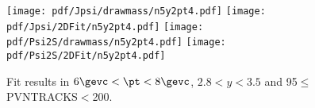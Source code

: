\begin{figure}[H]
\begin{center}
\texttt{[image: pdf/Jpsi/drawmass/n5y2pt4.pdf]}
\texttt{[image: pdf/Jpsi/2DFit/n5y2pt4.pdf]}
\vspace*{-0.5cm}
\texttt{[image: pdf/Psi2S/drawmass/n5y2pt4.pdf]}
\texttt{[image: pdf/Psi2S/2DFit/n5y2pt4.pdf]}
\vspace*{-0.5cm}
\end{center}
\caption{Fit results in $6\gevc<\pt<8\gevc$, $2.8<y<3.5$ and 95$\leq$PVNTRACKS$<$200.}
\label{Fitn5y2pt4}
\end{figure}

